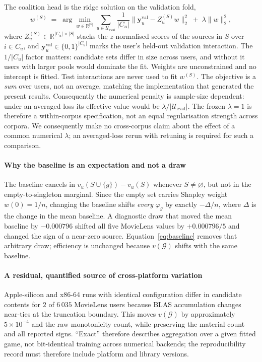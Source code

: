 \documentclass[pdflatex,sn-basic,Numbered]{sn-jnl}
\theoremstyle{plain}
\theoremstyle{definition}
\newcommand{\G}{\mathcal{G}}
\newcommand{\Cu}{C_u}
\newcommand{\Ueval}{\mathcal{U}_{\mathrm{eval}}}
\begin{document}
The coalition head is the ridge solution on the validation fold,
\begin{equation}
w^{(S)} \;=\; \arg\min_{w \in \mathbb{R}^{|S|}}
\sum_{u\in\Ueval} \frac{1}{|\Cu|}\bigl\| \mathbf{y}^{\mathrm{val}}_u - Z_u^{(S)} w \bigr\|_2^2
\;+\; \lambda \|w\|_2^2 ,
\label{eq:head}
\end{equation}
where $Z_u^{(S)} \in \mathbb{R}^{|\Cu| \times |S|}$ stacks the $z$-normalised
scores of the sources in $S$ over $i \in \Cu$, and
$\mathbf{y}^{\mathrm{val}}_u \in \{0,1\}^{|\Cu|}$ marks the user's held-out
validation interaction. The $1/|\Cu|$ factor matters: candidate sets differ in
size across users, and without it users with larger pools would dominate the
fit. Weights are unconstrained and no intercept is fitted. Test interactions
are never used to fit $w^{(S)}$. The objective is a \emph{sum} over users, not
an average, matching the implementation that generated the present results.
Consequently the numerical penalty is sample-size dependent: under an averaged
loss its effective value would be $\lambda/|\Ueval|$. The frozen $\lambda=1$
is therefore a within-corpus specification, not an equal regularisation
strength across corpora. We consequently make no cross-corpus claim about the
effect of a common numerical $\lambda$; an averaged-loss rerun with retuning is
required for such a comparison.

\paragraph{Why the baseline is an expectation and not a draw}
The baseline cancels in $v_u(S\cup\{g\}) - v_u(S)$ whenever $S \neq \varnothing$,
but not in the empty-to-singleton marginal. Since the empty set
carries Shapley weight $w(0) = 1/n$, changing the baseline shifts \emph{every}
$\varphi_g$ by exactly $-\Delta/n$, where $\Delta$ is the change in the mean
baseline. A diagnostic draw that moved the mean baseline by $-0.000796$ shifted
all five MovieLens values by $+0.000796/5$ and changed the sign of a near-zero
source. Equation~\eqref{eq:baseline} removes that arbitrary draw; efficiency is
unchanged because $v(\G)$ shifts with the same baseline.

\paragraph{A residual, quantified source of cross-platform variation}
Apple-silicon and x86-64 runs with identical configuration differ in candidate
contents for $2$ of $6\,035$ MovieLens users because BLAS accumulation changes
near-ties at the truncation boundary. This moves $v(\G)$ by approximately
$5\times10^{-4}$ and the raw monotonicity count, while preserving the material
count and all reported signs. ``Exact'' therefore describes aggregation over a
given fitted game, not bit-identical training across numerical backends; the
reproducibility record must therefore include platform and library versions.
\end{document}
